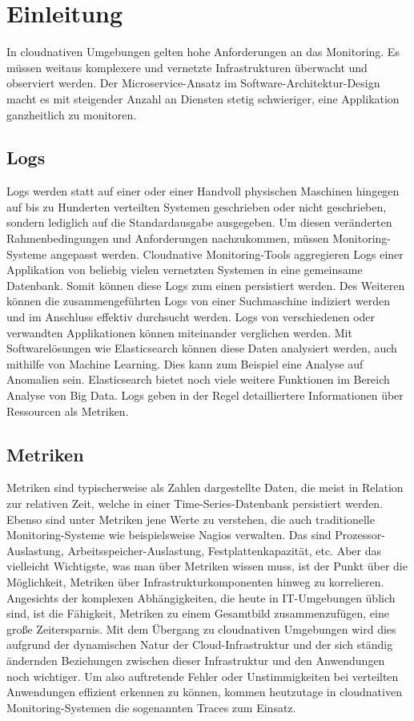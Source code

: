 \section{Einleitung}
\noindent
In cloudnativen Umgebungen gelten hohe Anforderungen an das Monitoring.
Es müssen weitaus komplexere und vernetzte Infrastrukturen überwacht und observiert werden.
Der Microservice-Ansatz im Software-Architektur-Design macht es mit
steigender Anzahl an Diensten stetig schwieriger, eine Applikation 
ganzheitlich zu monitoren.

\subsection{Logs}
Logs werden statt auf einer oder 
einer Handvoll physischen Maschinen hingegen auf bis zu Hunderten
verteilten Systemen geschrieben oder nicht geschrieben, sondern lediglich auf 
die Standardausgabe ausgegeben. Um diesen veränderten Rahmenbedingungen 
und Anforderungen nachzukommen, müssen Monitoring-Systeme angepasst werden.
Cloudnative Monitoring-Tools aggregieren Logs einer Applikation
von beliebig vielen vernetzten Systemen in eine gemeinsame Datenbank.
Somit können diese Logs zum einen persistiert werden. Des Weiteren können die 
zusammengeführten Logs von einer Suchmaschine indiziert werden und
im Anschluss effektiv durchsucht werden. Logs von verschiedenen oder 
verwandten Applikationen können miteinander verglichen werden.
Mit Softwarelösungen wie Elasticsearch \cite{elasticsearchWebsite}
können diese Daten analysiert werden, auch mithilfe von Machine Learning.
Dies kann zum Beispiel eine Analyse auf Anomalien sein.
Elasticsearch bietet noch viele weitere Funktionen im Bereich
Analyse von Big Data.
Logs geben in der Regel detailliertere Informationen über Ressourcen als Metriken.

\subsection{Metriken}
Metriken sind typischerweise als Zahlen dargestellte Daten, die meist in Relation
zur relativen Zeit, welche in einer Time-Series-Datenbank persistiert werden.
Ebenso sind unter Metriken jene Werte zu verstehen, 
die auch traditionelle Monitoring-Systeme wie beispielsweise
Nagios \cite{nagiosOrgWebsite}
verwalten. Das sind Prozessor-Auslastung, Arbeitsspeicher-Auslastung,
Festplattenkapazität, etc.
Aber das vielleicht Wichtigste, was man über Metriken wissen muss, ist der Punkt 
über die Möglichkeit, Metriken über Infrastrukturkomponenten hinweg zu korrelieren. 
Angesichts der komplexen Abhängigkeiten, die heute in IT-Umgebungen üblich sind, 
ist die Fähigkeit, Metriken zu einem Gesamtbild zusammenzufügen, eine große Zeitersparnis.
Mit dem Übergang zu cloudnativen Umgebungen wird dies aufgrund der dynamischen Natur der
Cloud-Infrastruktur und der sich ständig ändernden Beziehungen zwischen dieser
Infrastruktur und den Anwendungen noch wichtiger.
Um also auftretende Fehler oder Unstimmigkeiten bei verteilten Anwendungen
effizient erkennen zu können, kommen heutzutage in cloudnativen Monitoring-Systemen
die sogenannten Traces zum Einsatz.

